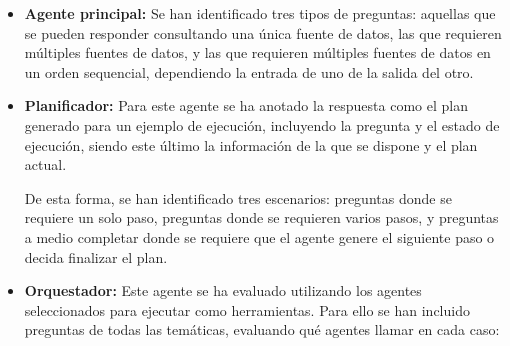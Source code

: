 \begin{itemize}
  \item\textbf{Agente principal: }Se han identificado tres tipos de preguntas: aquellas que se pueden responder consultando una única fuente de datos, las que requieren múltiples fuentes de datos, y las que requieren múltiples fuentes de datos en un orden sequencial, dependiendo la entrada de uno de la salida del otro.   
  \item\textbf{Planificador: }Para este agente se ha anotado la respuesta como el plan generado para un ejemplo de ejecución, incluyendo la pregunta y el estado de ejecución, siendo este último la información de la que se dispone y el plan actual.

De esta forma, se han identificado tres escenarios: preguntas donde se requiere un solo paso, preguntas donde se requieren varios pasos, y preguntas a medio completar donde se requiere que el agente genere el siguiente paso o decida finalizar el plan. 
\item\textbf{Orquestador: }Este agente se ha evaluado utilizando los agentes seleccionados para ejecutar como herramientas. Para ello se han incluido preguntas de todas las temáticas, evaluando qué agentes llamar en cada caso:


\end{itemize}
